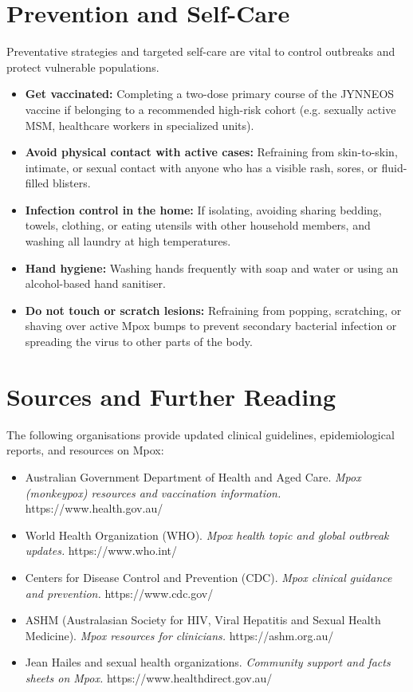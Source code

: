 \section*{Prevention and Self-Care}
Preventative strategies and targeted self-care are vital to control outbreaks and protect vulnerable populations.
\begin{itemize}
    \item \textbf{Get vaccinated:} Completing a two-dose primary course of the JYNNEOS vaccine if belonging to a recommended high-risk cohort (e.g. sexually active MSM, healthcare workers in specialized units).
    \item \textbf{Avoid physical contact with active cases:} Refraining from skin-to-skin, intimate, or sexual contact with anyone who has a visible rash, sores, or fluid-filled blisters.
    \item \textbf{Infection control in the home:} If isolating, avoiding sharing bedding, towels, clothing, or eating utensils with other household members, and washing all laundry at high temperatures.
    \item \textbf{Hand hygiene:} Washing hands frequently with soap and water or using an alcohol-based hand sanitiser.
    \item \textbf{Do not touch or scratch lesions:} Refraining from popping, scratching, or shaving over active Mpox bumps to prevent secondary bacterial infection or spreading the virus to other parts of the body.
\end{itemize}

\section*{Sources and Further Reading}
The following organisations provide updated clinical guidelines, epidemiological reports, and resources on Mpox:
\begin{itemize}
    \item Australian Government Department of Health and Aged Care. \textit{Mpox (monkeypox) resources and vaccination information.} https://www.health.gov.au/
    \item World Health Organization (WHO). \textit{Mpox health topic and global outbreak updates.} https://www.who.int/
    \item Centers for Disease Control and Prevention (CDC). \textit{Mpox clinical guidance and prevention.} https://www.cdc.gov/
    \item ASHM (Australasian Society for HIV, Viral Hepatitis and Sexual Health Medicine). \textit{Mpox resources for clinicians.} https://ashm.org.au/
    \item Jean Hailes and sexual health organizations. \textit{Community support and facts sheets on Mpox.} https://www.healthdirect.gov.au/
\end{itemize}
